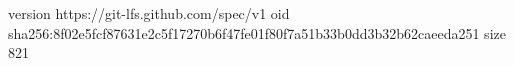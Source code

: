 version https://git-lfs.github.com/spec/v1
oid sha256:8f02e5fcf87631e2c5f17270b6f47fe01f80f7a51b33b0dd3b32b62caeeda251
size 821
